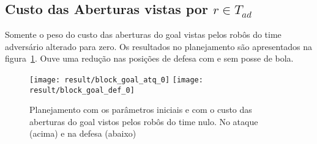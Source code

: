 \subsection{Custo das Aberturas vistas por $r \in T_{ad}$}
Somente o peso do custo das aberturas do goal vistas pelos robôs do time
adversário alterado para zero. Os resultados no planejamento são
apresentados na figura~\ref{fig:block_goal_0}. Ouve uma redução nas
posições de defesa com e sem posse de bola.

\begin{figure}[H]
  \centering
  \texttt{[image: result/block\_goal\_atq\_0]}
  \texttt{[image: result/block\_goal\_def\_0]}
  \caption{Planejamento com os parâmetros iniciais e com o custo
           das aberturas do goal vistos pelos robôs do time nulo.
           No ataque (acima) e na defesa (abaixo)}\label{fig:block_goal_0}
\end{figure}
